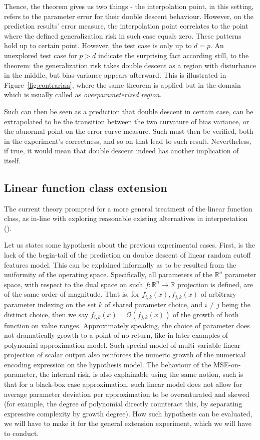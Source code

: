 \documentclass[10pt]{article} %
\begin{document}
Thence, the theorem gives us two things - the interpolation point, in this setting, refers to the parameter error for their double descent behaviour. However, on the prediction results' error measure, the interpolation point correlates to the point where the defined generalization risk in such case equals zero. These patterns hold up to certain point. However, the test case is only up to $d=p$. An unexplored test case for $p>d$ indicate the surprising fact according still, to the theorem: the generalization risk takes double descent as a region with disturbance in the middle, but bias-variance appears afterward. This is illustrated in Figure~\ref{fig:contrarian}, where the same theorem is applied but in the domain which is usually called as \textit{overparameterized region}. 

Such can then be seen as a prediction that double descent in certain case, can be extrapolated to be the transition between the two curvature of bias variance, or the abnormal point on the error curve measure. Such must then be verified, both in the experiment's correctness, and so on that lead to such result. Nevertheless, if true, it would mean that double descent indeed has another implication of itself. 
\subsection{Linear function class extension}

The current theory prompted for a more general treatment of the linear function class, as in-line with exploring reasonable existing alternatives in interpretation (\cite{nakkiran2019datahurtlinearregression}).

Let us states some hypothesis about the previous experimental cases. First, is the lack of the begin-tail of the prediction on double descent of linear random cutoff features model. This can be explained informally as to be resulted from the uniformity of the operating space. Specifically, all parameters of the $\mathbb{R}^{n}$ parameter space, with respect to the dual space on such $f:\mathbb{R}^{n}\to\mathbb{R}$ projection is defined, are of the same order of magnitude. That is, for $f_{i,k}(x),f_{j,k}(x)$ of arbitrary parameter indexing on the set $k$ of shared parameter choice, and $i\neq j$ being the distinct choice, then we say $f_{i,k}(x)=\mathcal{O}(f_{j,k}(x))$ of the growth of both function on value ranges. Approximately speaking, the choice of parameter does not dramatically growth to a point of no return, like in later examples of polynomial approximation model. Such special model of multi-variable linear projection of scalar output also reinforces the numeric growth of the numerical encoding expression on the hypothesis model. The behaviour of the MSE-on-parameter, the internal risk, is also explainable using the same notion, such is that for a black-box case approximation, such linear model does not allow for average parameter deviation per approximation to be oversaturated and skewed (for example, the degree of polynomial directly counteract this, by separating expressive complexity by growth degree). How such hypothesis can be evaluated, we will have to make it for the general extension experiment, which we will have to conduct. 
\end{document}
